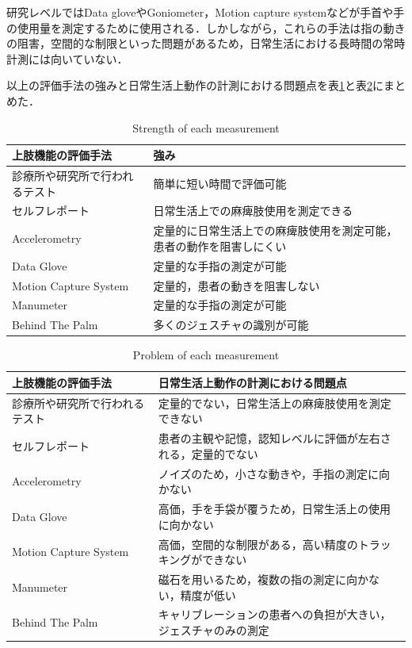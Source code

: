 研究レベルではData gloveやGoniometer，Motion capture system\cite{Binh2014,Valtin2017,Chen2003,Ren2011}などが手首や手の使用量を測定するために使用される．しかしながら，これらの手法は指の動きの阻害，空間的な制限といった問題があるため，日常生活における長時間の常時計測には向いていない．

以上の評価手法の強みと日常生活上動作の計測における問題点を表\ref{table:strength}と表\ref{table:weakness}にまとめた．
\begin{table}[H]
  \caption{Strength of each measurement}
  \label{table:strength}
  \centering
  \begin{tabular}{ll}
    \hline
    上肢機能の評価手法 & 強み\\
    \hline \hline 
    診療所や研究所で行われるテスト  & 簡単に短い時間で評価可能  \\
    セルフレポート & 日常生活上での麻痺肢使用を測定できる \\
    Accelerometry  & 定量的に日常生活上での麻痺肢使用を測定可能，患者の動作を阻害しにくい \\
    Data Glove  & 定量的な手指の測定が可能  \\
    Motion Capture System  & 定量的，患者の動きを阻害しない  \\
    Manumeter  & 定量的な手指の測定が可能 \\
    Behind The Palm  & 多くのジェスチャの識別が可能 \\ 
    \hline
  \end{tabular}
\end{table}

\begin{table}[H]
  \caption{Problem of each measurement}
  \label{table:weakness}
  \centering
  \begin{tabular}{ll}
    \hline
    上肢機能の評価手法 & 日常生活上動作の計測における問題点 \\
    \hline \hline 
    診療所や研究所で行われるテスト   & 定量的でない，日常生活上の麻痺肢使用を測定できない \\
    セルフレポート & 患者の主観や記憶，認知レベルに評価が左右される，定量的でない\\
    Accelerometry   & ノイズのため，小さな動きや，手指の測定に向かない \\
    Data Glove  &  高価，手を手袋が覆うため，日常生活上の使用に向かない \\
    Motion Capture System   & 高価，空間的な制限がある，高い精度のトラッキングができない \\
    Manumeter  & 磁石を用いるため，複数の指の測定に向かない，精度が低い\\
    Behind The Palm   & キャリブレーションの患者への負担が大きい，ジェスチャのみの測定\\ 
    \hline
  \end{tabular}
\end{table}

